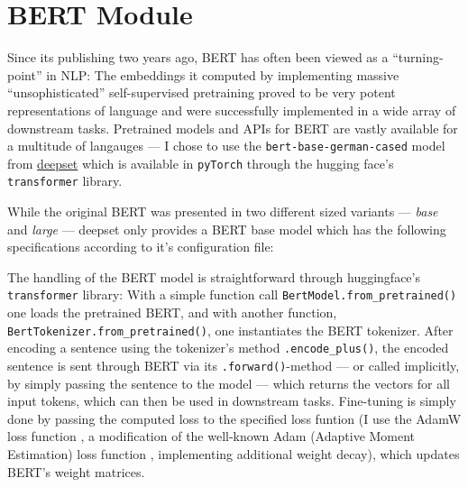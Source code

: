 \section{BERT Module}

Since its publishing two years ago, BERT \citep{devlin2018bert} has often been
viewed as a ``turning-point'' in NLP: The embeddings it computed by implementing
massive ``unsophisticated'' self-supervised pretraining proved to be very potent
representations of language and were successfully implemented in a wide array of
downstream tasks. Pretrained models and APIs for BERT are vastly available for
a multitude of langauges --- I chose to use the \texttt{bert-base-german-cased}
model from \href{https://deepset.ai/german-bert}{deepset} which is available in
\texttt{pyTorch} through the hugging face's \texttt{transformer} library\cite{wolf2019transformers}.

While the original BERT was presented in two different sized variants --- \emph{base}
and \emph{large} --- deepset only provides a BERT base model which has the following
specifications according to it's configuration file:


The handling of the BERT model is straightforward through huggingface's \texttt{transformer}
library: With a simple function call \texttt{BertModel.from\_pretrained()} one loads the
pretrained BERT, and with another function, \texttt{BertTokenizer.from\_pretrained()},
one instantiates the BERT tokenizer.
After encoding a sentence using the tokenizer's method \texttt{.encode\_plus()}, the
encoded sentence is sent through BERT via its \texttt{.forward()}-method --- or
called implicitly, by simply passing the sentence to the model --- which returns the
vectors for all input tokens, which can then be used in downstream tasks. Fine-tuning
is simply done by passing the computed loss to the specified loss funtion (I use the
AdamW loss function \citep{loshchilov2019decoupled}, a modification of the well-known
Adam (Adaptive Moment Estimation) loss function \citep{kingma2014adam}, implementing
additional weight decay), which updates BERT's weight matrices.



